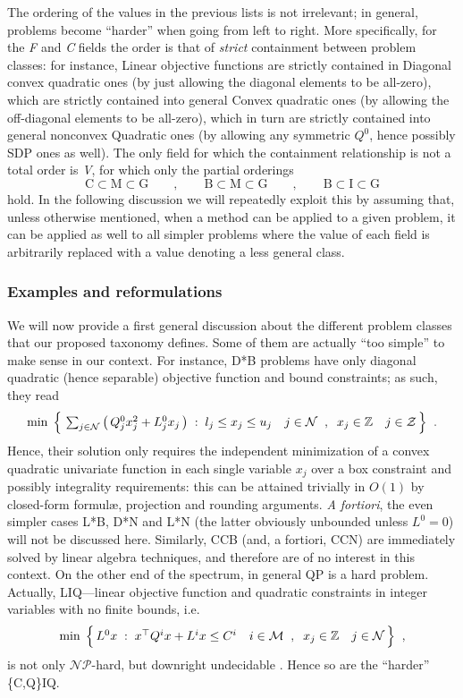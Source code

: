 The ordering of the values in the previous lists is not irrelevant; in general, problems become ``harder'' when going from left to right. More specifically, for the \textit{F} and \textit{C} fields the order is that of \emph{strict} containment between problem classes: for instance, Linear objective functions are strictly contained in Diagonal convex quadratic ones (by just allowing the diagonal elements to be all-zero), which are strictly contained into general Convex quadratic ones (by allowing the off-diagonal elements to be all-zero), which in turn are strictly contained into general nonconvex Quadratic ones (by allowing any symmetric $Q^0$, hence possibly SDP ones as well). The only field for which the containment relationship is not a total order is \textit{V}, for which only the partial orderings
\[
 \mbox{C} \subset \mbox{M} \subset \mbox{G}
 \qquad,\qquad
 \mbox{B} \subset \mbox{M} \subset \mbox{G}
 \qquad,\qquad
 \mbox{B} \subset \mbox{I} \subset \mbox{G}
\]
hold. In the following discussion we will repeatedly exploit this by assuming that, unless otherwise mentioned, when a method can be applied to a given problem, it can be applied as well to all simpler problems where the value of each field is arbitrarily replaced with a value denoting a less general class.

\subsubsection{Examples and reformulations}\label{ssec:reform}

We will now provide a first general discussion about the different problem classes that our proposed taxonomy defines. Some of them are actually ``too simple'' to make sense in our context. For instance, D*B problems have only diagonal quadratic (hence separable) objective function and bound constraints; as such, they read
\[
 \textstyle
 \min \; \Big\{ \,
 \sum_{j \in \mathcal{N}} \big( \, Q^0_j x_j^2 + L^0_j x_j \, \big) \;:\;
 l_j \leq x_j \leq u_j \quad j \in \mathcal{N} \;\;,\;\;
 x_j \in \mathbb{Z} \quad j \in \mathcal{Z} \, \Big\}
 \;\; .
\]
Hence, their solution only requires the independent minimization of a convex quadratic univariate function in each single variable $x_j$ over a box constraint and possibly integrality requirements: this can be attained trivially in $O(1)$ by closed-form formul{\ae}, projection and rounding arguments. \emph{A fortiori}, the even simpler cases L*B, D*N and L*N (the latter obviously unbounded unless $L^0 = 0$) will not be discussed here. Similarly, CCB (and, a fortiori, CCN) are immediately solved by linear algebra techniques, and therefore are of no interest in this context. On the other end of the spectrum, in general QP is a hard problem. Actually, LIQ---linear objective function and quadratic constraints in integer variables with no finite bounds, i.e. 
\[
 \textstyle
 \min \; \Big\{ \, L^0 x \;:\;
 x^\top Q^i x + L^i x \leq C^i \quad i \in \mathcal{M} \;\;,\;\;
 x_j \in \mathbb{Z} \quad j \in \mathcal{N} \, \Big\}
 \;\; ,
\]
is not only $\mathcal{NP}$-hard, but downright undecidable \cite{jeroslow}. Hence so are the ``harder'' \{C,Q\}IQ.

